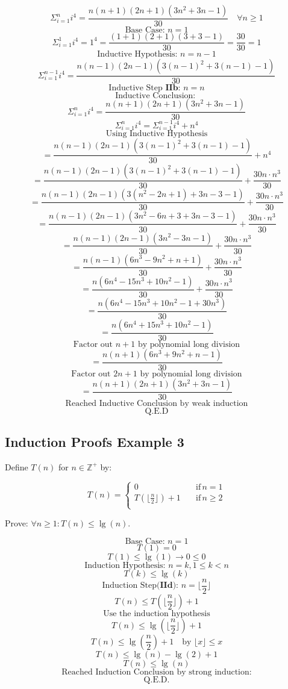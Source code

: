 \documentclass{article}
\begin{document}
$$\Sigma_{i=1}^{n} i^4 = \frac{n(n + 1)(2n + 1)(3n^2 + 3n - 1)}{30} \quad \forall n \ge 1$$
$$\text{Base Case: } n = 1$$
$$\Sigma_{i=1}^{1} i^4  = 1^4 = \frac{(1 + 1)(2 + 1)(3 + 3 - 1)}{30} = \frac{30}{30} = 1 $$
$$\text{Inductive Hypothesis: } n = n - 1$$
$$\Sigma_{i=1}^{n - 1} i^4 = \frac{n(n - 1)(2n - 1)(3(n -1)^2 + 3(n-1) - 1)}{30} $$
$$\text{Inductive Step } \textbf{IIb} \text{: } n = n$$
$$\text{Inductive Conclusion: }$$
$$\Sigma_{i=1}^{n} i^4 = \frac{n(n+1)(2n +1)(3n ^2 + 3n - 1)}{30} $$
$$\Sigma_{i=1}^{n} i^4 =  \Sigma_{i=1}^{n-1} i^4 + n^4$$
$$\text{Using Inductive Hypothesis}$$
$$= \frac{n(n - 1)(2n - 1)(3(n -1)^2 + 3(n-1) - 1)}{30} + n^4$$
$$= \frac{n(n - 1)(2n - 1)(3(n -1)^2 + 3(n-1) - 1)}{30} + \frac{30n \cdot n^3}{30}$$
$$= \frac{n(n - 1)(2n - 1)(3(n^2 - 2n + 1) + 3n- 3 - 1)}{30} + \frac{30n \cdot n^3}{30}$$
$$= \frac{n(n - 1)(2n - 1)(3n^2 - 6n + 3 + 3n - 3 - 1)}{30} + \frac{30n \cdot n^3}{30}$$
$$= \frac{n(n - 1)(2n - 1)(3n^2 - 3n - 1)}{30} + \frac{30n \cdot n^3}{30}$$
$$= \frac{n(n - 1)(6n^3 - 9n^2 + n + 1)}{30} + \frac{30n \cdot n^3}{30}$$
$$= \frac{n(6n^4 - 15n^3 + 10n^2 - 1)}{30} + \frac{30n \cdot n^3}{30}$$
$$= \frac{n(6n^4 - 15n^3 + 10n^2 - 1 + 30n^3)}{30} $$
$$= \frac{n(6n^4 + 15n^3 + 10n^2 - 1)}{30} $$
$$\text{Factor out } n+1 \text{ by polynomial long division}$$
$$= \frac{n(n+1)(6n^3 + 9n^2 + n - 1)}{30} $$
$$\text{Factor out } 2n+1 \text{ by polynomial long division}$$
$$= \frac{n(n+1)(2n+1)(3n^2 + 3n - 1)}{30} $$
$$\text{Reached Inductive Conclusion by weak induction}$$
$$\text{Q.E.D}$$

\subsection{Induction Proofs Example 3}
Define $T(n)$ for $n \in \mathbb{Z}^+$ by:

\begin{equation*}
T(n)=\begin{cases}
          0 \quad &\text{if} \, n = 1 \\
          T(\lfloor \frac{n}{2} \rfloor) + 1\quad &\text{if} \, n \ge 2\\
     \end{cases}
\end{equation*}

Prove: $\forall n \ge 1: T(n) \le \lg(n)$.

$$\text{Base Case: } n = 1$$
$$T(1) = 0$$
$$T(1) \le \lg(1) \rightarrow 0 \le 0$$
$$\text{Induction Hypothesis: } n = k, 1 \le k < n $$
$$T(k) \le \lg(k)$$
$$\text{Induction Step(} \textbf{IId} \text{): } n = \lfloor \frac{n}{2} \rfloor$$
$$T(n) \le T(\lfloor \frac{n}{2} \rfloor) + 1$$
$$\text{Use the induction hypothesis}$$
$$T(n) \le \lg(\lfloor \frac{n}{2} \rfloor) + 1$$
$$T(n) \le \lg(\frac{n}{2}) + 1 \quad \text{by } \lfloor x \rfloor \le x$$
$$T(n) \le \lg(n) - \lg(2) + 1 $$
$$T(n) \le \lg(n) $$
$$\text{Reached Induction Conclusion by strong induction:}$$
$$\text{Q.E.D.}$$
\end{document}
